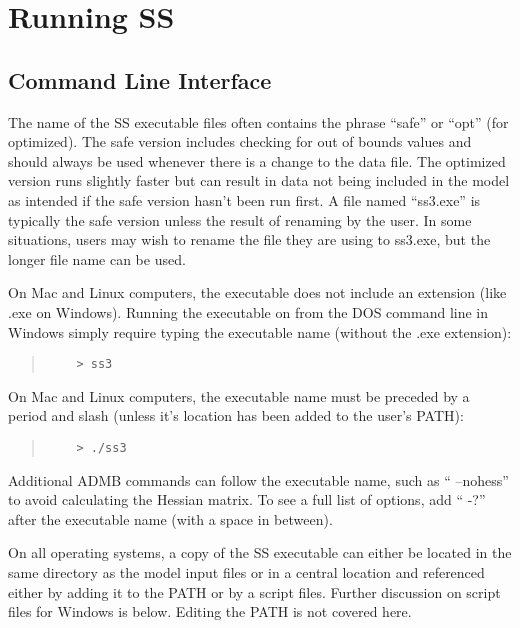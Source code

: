 \section{Running SS}\label{RunningSS}

\subsection{Command Line Interface}
The name of the SS executable files often contains the phrase “safe” or “opt” (for optimized). The safe version includes checking for out of bounds values and should always be used whenever there is a change to the data file. The optimized version runs slightly faster but can result in data not being included in the model as intended if the safe version hasn’t been run first. A file named “ss3.exe” is typically the safe version unless the result of renaming by the user. In some situations, users may wish to rename the file they are using to ss3.exe, but the longer file name can be used.

On Mac and Linux computers, the executable does not include an extension (like .exe on Windows).
Running the executable on from the DOS command line in Windows simply require typing the executable name (without the .exe extension):
\begin{quote}
	\begin{verbatim}
	> ss3
	\end{verbatim}
\end{quote}



On Mac and Linux computers, the executable name must be preceded by a period and slash (unless it’s location has been added to the user’s PATH):

\begin{quote}
	\begin{verbatim}
	> ./ss3
	\end{verbatim}
\end{quote}


Additional ADMB commands can follow the executable name, such as “ –nohess” to avoid calculating the Hessian matrix. To see a full list of options, add “ -?” after the executable name (with a space in between).

On all operating systems, a copy of the SS executable can either be located in the same directory as the model input files or in a central location and referenced either by adding it to the PATH or by a script files. Further discussion on script files for Windows is below. Editing the PATH is not covered here.


